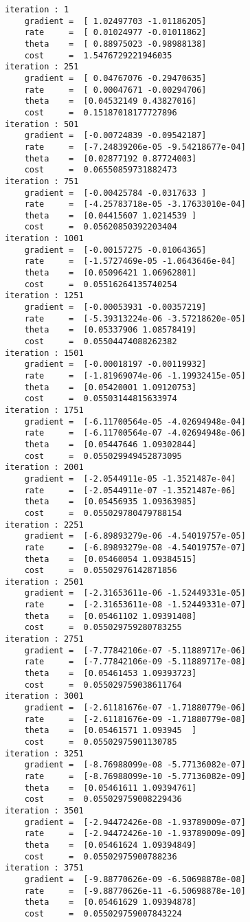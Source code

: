 \documentclass[11pt]{article}
\begin{document}
    \begin{Verbatim}[commandchars=\\\{\}]
iteration : 1
	gradient =  [ 1.02497703 -1.01186205]
	rate     =  [ 0.01024977 -0.01011862]
	theta    =  [ 0.88975023 -0.98988138]
	cost     =  1.5476729221946035
iteration : 251
	gradient =  [ 0.04767076 -0.29470635]
	rate     =  [ 0.00047671 -0.00294706]
	theta    =  [0.04532149 0.43827016]
	cost     =  0.15187018177727896
iteration : 501
	gradient =  [-0.00724839 -0.09542187]
	rate     =  [-7.24839206e-05 -9.54218677e-04]
	theta    =  [0.02877192 0.87724003]
	cost     =  0.06550859731882473
iteration : 751
	gradient =  [-0.00425784 -0.0317633 ]
	rate     =  [-4.25783718e-05 -3.17633010e-04]
	theta    =  [0.04415607 1.0214539 ]
	cost     =  0.05620850392203404
iteration : 1001
	gradient =  [-0.00157275 -0.01064365]
	rate     =  [-1.5727469e-05 -1.0643646e-04]
	theta    =  [0.05096421 1.06962801]
	cost     =  0.05516264135740254
iteration : 1251
	gradient =  [-0.00053931 -0.00357219]
	rate     =  [-5.39313224e-06 -3.57218620e-05]
	theta    =  [0.05337906 1.08578419]
	cost     =  0.05504474088262382
iteration : 1501
	gradient =  [-0.00018197 -0.00119932]
	rate     =  [-1.81969074e-06 -1.19932415e-05]
	theta    =  [0.05420001 1.09120753]
	cost     =  0.05503144815633974
iteration : 1751
	gradient =  [-6.11700564e-05 -4.02694948e-04]
	rate     =  [-6.11700564e-07 -4.02694948e-06]
	theta    =  [0.05447646 1.09302844]
	cost     =  0.055029949452873095
iteration : 2001
	gradient =  [-2.0544911e-05 -1.3521487e-04]
	rate     =  [-2.0544911e-07 -1.3521487e-06]
	theta    =  [0.05456935 1.09363985]
	cost     =  0.055029780479788154
iteration : 2251
	gradient =  [-6.89893279e-06 -4.54019757e-05]
	rate     =  [-6.89893279e-08 -4.54019757e-07]
	theta    =  [0.05460054 1.09384515]
	cost     =  0.05502976142871856
iteration : 2501
	gradient =  [-2.31653611e-06 -1.52449331e-05]
	rate     =  [-2.31653611e-08 -1.52449331e-07]
	theta    =  [0.05461102 1.09391408]
	cost     =  0.055029759280783255
iteration : 2751
	gradient =  [-7.77842106e-07 -5.11889717e-06]
	rate     =  [-7.77842106e-09 -5.11889717e-08]
	theta    =  [0.05461453 1.09393723]
	cost     =  0.055029759038611764
iteration : 3001
	gradient =  [-2.61181676e-07 -1.71880779e-06]
	rate     =  [-2.61181676e-09 -1.71880779e-08]
	theta    =  [0.05461571 1.093945  ]
	cost     =  0.05502975901130785
iteration : 3251
	gradient =  [-8.76988099e-08 -5.77136082e-07]
	rate     =  [-8.76988099e-10 -5.77136082e-09]
	theta    =  [0.05461611 1.09394761]
	cost     =  0.055029759008229436
iteration : 3501
	gradient =  [-2.94472426e-08 -1.93789009e-07]
	rate     =  [-2.94472426e-10 -1.93789009e-09]
	theta    =  [0.05461624 1.09394849]
	cost     =  0.05502975900788236
iteration : 3751
	gradient =  [-9.88770626e-09 -6.50698878e-08]
	rate     =  [-9.88770626e-11 -6.50698878e-10]
	theta    =  [0.05461629 1.09394878]
	cost     =  0.055029759007843224

    \end{Verbatim}
\end{document}
